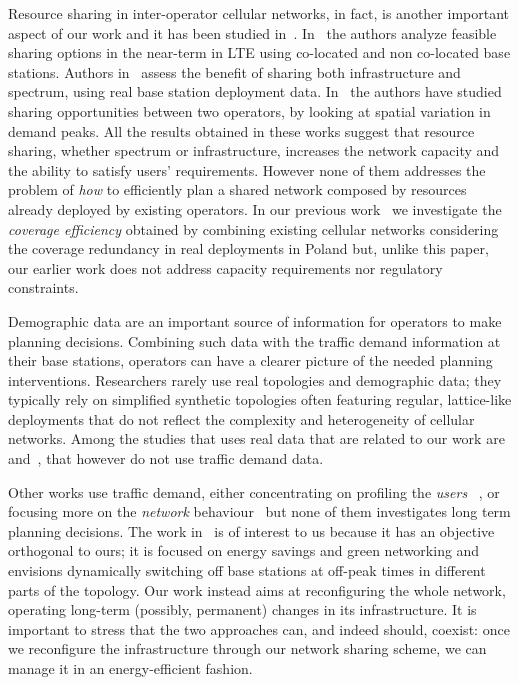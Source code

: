 \documentclass[10pt,journal,cspaper,compsoc]{IEEEtran}
\begin{document}
Resource sharing in inter-operator cellular networks, in fact, is another important aspect of our work and it has been studied in~\cite{panchal2013,hua2012,difrancesco2014,kibilda2013}.
In~\cite{panchal2013} the authors analyze feasible sharing options in the near-term in LTE using co-located and non co-located base stations.
Authors in~\cite{hua2012} assess the benefit of sharing both infrastructure and spectrum, using real base station deployment data.
In~\cite{difrancesco2014} the authors have studied sharing opportunities between two operators, by looking at 
spatial variation in demand peaks.
All the results obtained in these works suggest that resource sharing, whether spectrum or infrastructure,
increases the network capacity and the ability to satisfy users' requirements.
However none of them addresses the problem of \emph{how} to efficiently plan a shared network composed 
by resources already deployed by existing operators.
In our previous work~\cite{kibilda2013} we investigate the \emph{coverage efficiency} obtained by combining 
existing cellular networks considering the coverage redundancy in real deployments in Poland but, unlike this 
paper, our earlier work does not address capacity requirements nor regulatory constraints.

Demographic data are an important source of information for operators to make planning decisions.
Combining such data with the traffic demand information at their base stations, operators can have a clearer 
picture of the needed planning interventions.
Researchers rarely use real topologies and demographic data; they typically rely on simplified synthetic 
topologies often featuring regular, lattice-like deployments that do not reflect the complexity and heterogeneity 
of cellular networks.
Among the studies that uses real data that are related to our work are~\cite{kibilda2013} and~\cite{hua2012}, 
that however do not use traffic demand data.

Other works use traffic demand, either concentrating on profiling the \emph{users}~
\cite{shafiq2012,keralapura2010,paul2011}, or focusing more on the \emph{network} behaviour~
\cite{peng2011,willkomm2008,paul2011,paul2012} but none of them investigates long term planning decisions.
The work in~\cite{peng2011} is of interest to us because it has an objective orthogonal to ours;
it is focused on energy savings and green networking and envisions dynamically switching off base stations at 
off-peak times in different parts of the topology.
Our work instead aims at reconfiguring the whole network, operating long-term (possibly, permanent) changes in 
its infrastructure.
It is important to stress that the two approaches can, and indeed should, coexist: once we reconfigure the 
infrastructure through our network sharing scheme, we can manage it in an energy-efficient fashion.
\end{document}
